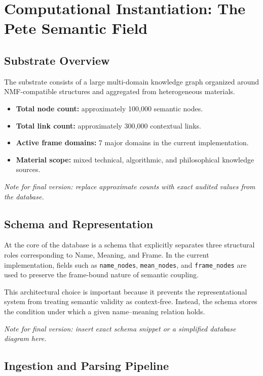 \documentclass[11pt,a4paper]{article}
\begin{document}
\section{Computational Instantiation: The Pete Semantic Field}

\subsection{Substrate Overview}

The substrate consists of a large multi-domain knowledge graph organized around NMF-compatible structures and aggregated from heterogeneous materials.

\begin{itemize}[leftmargin=2em]
    \item \textbf{Total node count:} approximately 100{,}000 semantic nodes.
    \item \textbf{Total link count:} approximately 300{,}000 contextual links.
    \item \textbf{Active frame domains:} 7 major domains in the current implementation.
    \item \textbf{Material scope:} mixed technical, algorithmic, and philosophical knowledge sources.
\end{itemize}

\textit{Note for final version: replace approximate counts with exact audited values from the database.}

\subsection{Schema and Representation}

At the core of the database is a schema that explicitly separates three structural roles corresponding to Name, Meaning, and Frame. In the current implementation, fields such as \texttt{name\_nodes}, \texttt{mean\_nodes}, and \texttt{frame\_nodes} are used to preserve the frame-bound nature of semantic coupling.

This architectural choice is important because it prevents the representational system from treating semantic validity as context-free. Instead, the schema stores the condition under which a given name--meaning relation holds.

\textit{Note for final version: insert exact schema snippet or a simplified database diagram here.}

\subsection{Ingestion and Parsing Pipeline}
\end{document}

